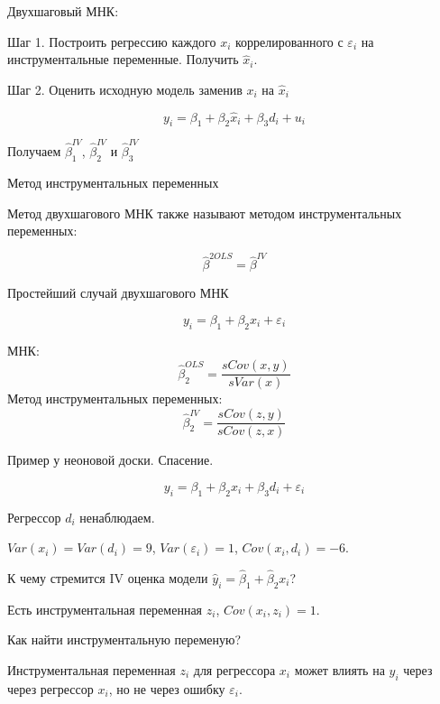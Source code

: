 \documentclass[ignorenonframetext,]{beamer}
\newcommand{\e}{\varepsilon}
\begin{document}
\begin{frame}{Двухшаговый МНК:}

Шаг 1. Построить регрессию каждого \(x_i\) коррелированного с \(\e_i\)
на инструментальные переменные. Получить \(\hat{x}_i\).

Шаг 2. Оценить исходную модель заменив \(x_i\) на \(\hat{x}_i\)

\[
y_i = \beta_1 + \beta_2 \hat{x}_i + \beta_3 d_i + u_i
\]

Получаем \(\hat{\beta}_1^{IV}\), \(\hat{\beta}_2^{IV}\) и
\(\hat{\beta}_3^{IV}\)

\end{frame}

\begin{frame}{Метод инструментальных переменных}

Метод двухшагового МНК также называют методом инструментальных
переменных:

\[
\hat{\beta}^{2OLS}=\hat{\beta}^{IV}
\]

\end{frame}

\begin{frame}{Простейший случай двухшагового МНК}

\[
y_i=\beta_1+\beta_2 x_i + \e_i
\]

МНК: \[
\hat{\beta}_2^{OLS}=\frac{sCov(x,y)}{sVar(x)}
\] Метод инструментальных переменных: \[
\hat{\beta}_2^{IV}=\frac{sCov(z,y)}{sCov(z,x)}
\]

\end{frame}

\begin{frame}{Пример у неоновой доски. Спасение.}

\[
y_i= \beta_1 + \beta_2 x_i + \beta_3 d_i + \varepsilon_i
\]

Регрессор \(d_i\) ненаблюдаем.

\(Var(x_i)=Var(d_i)=9\), \(Var(\varepsilon_i)=1\), \(Cov(x_i,d_i)=-6\).

К чему стремится IV оценка модели
\(\hat{y}_i = \hat{\beta}_1 + \hat{\beta}_2 x_i\)?

Есть инструментальная переменная \(z_i\), \(Cov(x_i,z_i)=1\).

\end{frame}

\begin{frame}{Как найти инструментальную переменую?}

Инструментальная переменная \(z_i\) для регрессора \(x_i\) может влиять
на \(y_i\) через через регрессор \(x_i\), но не через ошибку \(\e_i\).

\end{frame}
\end{document}
